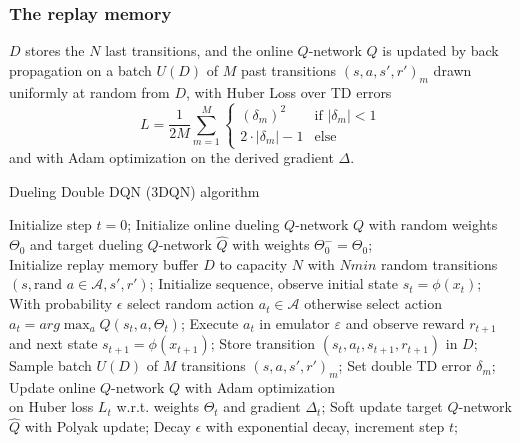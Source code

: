 \documentclass[journal]{IEEEtran}
\begin{document}
\subsubsection{The replay memory} $D$ stores the $N$ last transitions, and the online $Q$-network $Q$ is updated by back propagation on a batch $U(D)$ of $M$ past transitions $(s,a,s',r')_m$ drawn uniformly at random from $D$, with Huber Loss over TD errors
\[ 
L = \frac{1}{2M}\sum_{m=1}^M
\begin{cases}
  (\delta_m)^2 & \text{if } |\delta_m| < 1 \\
  2 \cdot |\delta_m| - 1 & \text{else}
\end{cases}
\]
and with Adam optimization \cite{kingma2017adam} on the derived gradient $\Delta$.

\begin{algorithm}[H]
\caption*{Dueling Double DQN (3DQN) algorithm}
\begin{algorithmic}
    \STATE Initialize step $t = 0$;
    \STATE Initialize online dueling $Q$-network $Q$ with random weights $\Theta_0$ and target dueling $Q$-network $\widehat{Q}$ with weights $\Theta^-_0 = \Theta_0$; \\
    \STATE Initialize replay memory buffer $D$ to capacity $N$
    \STATE with $Nmin$ random transitions $(s,\text{rand }a \in \mathcal{A},s',r')$;
        \bindent
        \STATE Initialize sequence, observe initial state $s_t=\phi(x_t)$;
            \bindent
            \STATE With probability $\epsilon$ select random action $a_t \in \mathcal{A}$
            \STATE otherwise select action $a_t = arg\max_{a}Q(s_t,a,\Theta_t)$;
            \STATE Execute $a_t$ in emulator $\varepsilon$ and
            \STATE observe reward $r_{t+1}$ and next state $s_{t+1}=\phi(x_{t+1})$;
            \STATE Store transition $(s_t,a_t,s_{t+1},r_{t+1})$ in $D$;
            \STATE Sample batch $U(D)$ of $M$ transitions $(s,a,s',r')_m$;
                \bindent
                \STATE Set double TD error $\delta_m$;
                \eindent
            \ENDFOR
            \STATE Update online $Q$-network $Q$ with Adam optimization \\
            on Huber loss $L_t$ w.r.t. weights $\Theta_t$ and gradient $\Delta_t$;
            \STATE Soft update target $Q$-network $\widehat{Q}$ with Polyak update;
            \STATE Decay $\epsilon$ with exponential decay, increment step $t$;
            \eindent
        \ENDWHILE
        \eindent
    \ENDFOR
\end{algorithmic}
\end{algorithm}
\end{document}

